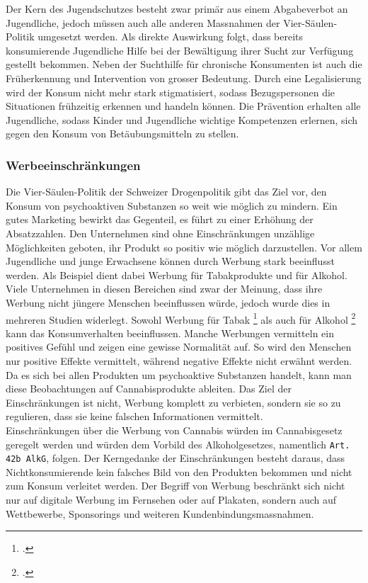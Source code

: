 \documentclass[../main.tex]{subfiles}
\begin{document}
	 \noindent
	 Der Kern des Jugendschutzes besteht zwar primär aus einem Abgabeverbot an Jugendliche, jedoch müssen auch alle anderen Massnahmen der Vier-Säulen-Politik umgesetzt werden. 
	 Als direkte Auswirkung folgt, dass bereits konsumierende Jugendliche Hilfe bei der Bewältigung ihrer Sucht zur Verfügung gestellt bekommen. 
	 Neben der Suchthilfe für chronische Konsumenten ist auch die Früherkennung und Intervention von grosser Bedeutung. 
	 Durch eine Legalisierung wird der Konsum nicht mehr stark stigmatisiert, sodass Bezugspersonen die Situationen frühzeitig erkennen und handeln können. 
	 Die Prävention erhalten alle Jugendliche, sodass Kinder und Jugendliche wichtige Kompetenzen erlernen, sich gegen den Konsum von Betäubungsmitteln zu stellen.  
	 
	 \subsubsection{Werbeeinschränkungen}
	 Die Vier-Säulen-Politik der Schweizer Drogenpolitik gibt das Ziel vor, den Konsum von psychoaktiven Substanzen so weit wie möglich zu mindern.
	 Ein gutes Marketing bewirkt das Gegenteil, es führt zu einer Erhöhung der Absatzzahlen.
	 Den Unternehmen sind ohne Einschränkungen unzählige Möglichkeiten geboten, ihr Produkt so positiv wie möglich darzustellen.	 
	 Vor allem Jugendliche und junge Erwachsene können durch Werbung stark beeinflusst werden.
	 Als Beispiel dient dabei Werbung für Tabakprodukte und für Alkohol.
	 Viele Unternehmen in diesen Bereichen sind zwar der Meinung, dass ihre Werbung nicht jüngere Menschen beeinflussen würde, jedoch wurde dies in mehreren Studien widerlegt.
	 Sowohl Werbung für Tabak \footcite{lovato} als auch für Alkohol \footcite{jernigan} kann das Konsumverhalten beeinflussen.
	 Manche Werbungen vermitteln ein positives Gefühl und zeigen eine gewisse Normalität auf. 
	 So wird den Menschen nur positive Effekte vermittelt, während negative Effekte nicht erwähnt werden.
	 Da es sich bei allen Produkten um psychoaktive Substanzen handelt, kann man diese Beobachtungen auf Cannabisprodukte ableiten.
	 Das Ziel der Einschränkungen ist nicht, Werbung komplett zu verbieten, sondern sie so zu regulieren, dass sie keine falschen Informationen vermittelt.\\
	 
	 \noindent	 
	 Einschränkungen über die Werbung von Cannabis würden im Cannabisgesetz geregelt werden und würden dem Vorbild des Alkoholgesetzes, namentlich \texttt{Art. 42b AlkG}, folgen.
	 Der Kerngedanke der Einschränkungen besteht daraus, dass Nichtkonsumierende kein falsches Bild von den Produkten bekommen und nicht zum Konsum verleitet werden.
	 Der Begriff von Werbung beschränkt sich nicht nur auf digitale Werbung im Fernsehen oder auf Plakaten, sondern auch auf Wettbewerbe, Sponsorings und weiteren Kundenbindungsmassnahmen.
	 
\end{document}
